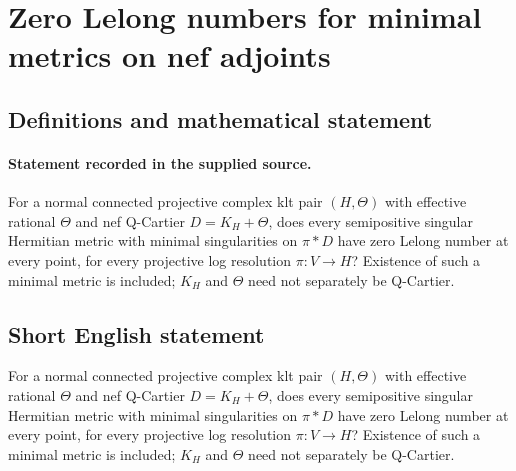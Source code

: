 \documentclass[11pt]{article}
\begin{document}
\section*{Zero Lelong numbers for minimal metrics on nef adjoints}\label{30007049}
\subsection{Definitions and mathematical statement}
\paragraph{Statement recorded in the supplied source.}
For a normal connected projective complex klt pair $(H,\Theta )$ with effective rational $\Theta $ and nef Q-Cartier $D=K_H+\Theta $, does every semipositive singular Hermitian metric with minimal singularities on $\pi *D$ have zero Lelong number at every point, for every projective log resolution $\pi :V\to H$? Existence of such a minimal metric is included; $K_H$ and $\Theta $ need not separately be Q-Cartier.
\subsection{Short English statement}
For a normal connected projective complex klt pair $(H,\Theta )$ with effective rational $\Theta $ and nef Q-Cartier $D=K_H+\Theta $, does every semipositive singular Hermitian metric with minimal singularities on $\pi *D$ have zero Lelong number at every point, for every projective log resolution $\pi :V\to H$? Existence of such a minimal metric is included; $K_H$ and $\Theta $ need not separately be Q-Cartier.
\end{document}
